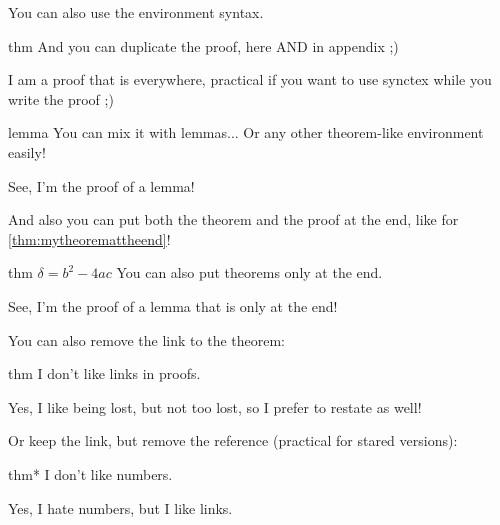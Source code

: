 \documentclass{article}
\begin{document}
\begin{textAtEnd}
  You can also use the environment syntax.
\end{textAtEnd}


\begin{theoremEnd}{thm}
  And you can duplicate the proof, here AND in appendix ;)  
\end{theoremEnd}
\begin{proofEnd}
  I am a proof that is everywhere, practical if you want to use synctex while you write the proof ;)
\end{proofEnd}

\begin{theoremEnd}{lemma}
  You can mix it with lemmas... Or any other theorem-like environment easily!  
\end{theoremEnd}
\begin{proofEnd}
  See, I'm the proof of a lemma!  
\end{proofEnd}

And also you can put both the theorem and the proof at the end, like for \autoref{thm:mytheoremattheend}!

\begin{theoremEnd}{thm}
  \label{thm:mytheoremattheend}
  $\delta = b^2-4ac$
  You can also put theorems only at the end.  
\end{theoremEnd}
\begin{proofEnd}
  See, I'm the proof of a lemma that is only at the end!
\end{proofEnd}


You can also remove the link to the theorem:
\begin{theoremEnd}{thm}
  I don't like links in proofs.  
\end{theoremEnd}
\begin{proofEnd}
  Yes, I like being lost, but not too lost, so I prefer to restate as well!
\end{proofEnd}

Or keep the link, but remove the reference (practical for stared versions):
\begin{theoremEnd}[stared]{thm*}
  I don't like numbers.
\end{theoremEnd}
\begin{proofEnd}
  Yes, I hate numbers, but I like links.
\end{proofEnd}
\end{document}
